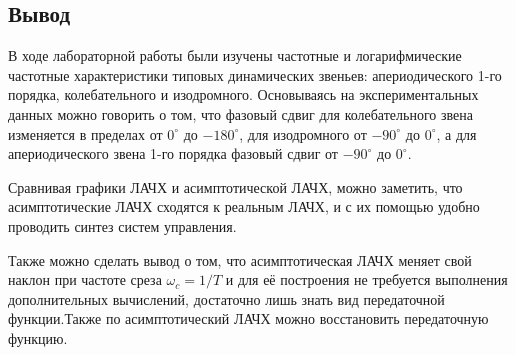 \documentclass[a4paper,12pt]{article} %
\begin{document}
\newpage
\begin{center}
	\section*{Вывод}
\end{center}
\par
В ходе лабораторной работы были изучены частотные и логарифмические частотные характеристики типовых динамических звеньев: апериодического 1-го порядка, колебательного и изодромного.
Основываясь на экспериментальных данных можно говорить о том, что фазовый сдвиг для колебательного звена изменяется в пределах от $0^{\circ}$ до $-180^{\circ}$, для изодромного от $-90^{\circ}$ до $0^{\circ}$, а для апериодического звена 1-го порядка фазовый сдвиг от $-90^{\circ}$ до $0^{\circ}$.\par
Сравнивая графики ЛАЧХ и асимптотической ЛАЧХ, можно заметить, что асимптотические ЛАЧХ сходятся к реальным ЛАЧХ, и с их помощью удобно проводить синтез систем управления.\par
Также можно сделать вывод о том, что асимптотическая ЛАЧХ меняет свой наклон при частоте среза $\omega_c = 1/T$ и для её построения не требуется выполнения дополнительных вычислений, достаточно лишь знать вид передаточной функции.Также по асимптотический ЛАЧХ можно восстановить передаточную функцию.  
\end{document}

